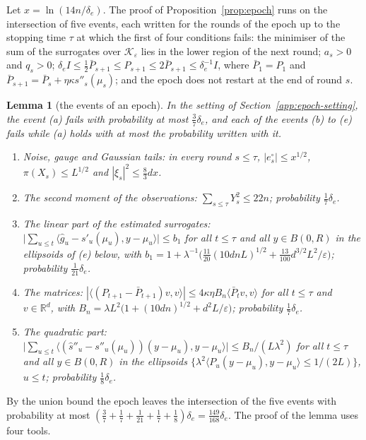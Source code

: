 \documentclass[11pt]{amsart}
\newtheorem{lemma}[theorem]{Lemma}
\theoremstyle{definition}
\numberwithin{equation}{section}
\newcommand{\R}{\mathbb{R}}
\newcommand{\cK}{\mathcal{K}}
\newcommand{\ip}[1]{\langle #1\rangle}
\begin{document}
Let $x=\ln(14n/\delta_e)$. The proof of Proposition~\ref{prop:epoch} runs on the intersection of five events, each written for the rounds of the epoch up to the stopping time $\tau$ at which the first of four conditions fails: the minimiser of the sum of the surrogates over $\cK_\varepsilon$ lies in the lower region of the next round; $a_s>0$ and $q_s>0$; $\delta_eI\le\frac12\bar P_{s+1}\le P_{s+1}\le2\bar P_{s+1}\le\delta_e^{-1}I$, where $\bar P_1=P_1$ and $\bar P_{s+1}=\bar P_s+\eta\kappa s''_s(\mu_s)$; and the epoch does not restart at the end of round $s$.
\begin{lemma}[the events of an epoch]\label{lem:events}
In the setting of Section~\ref{app:epoch-setting}, the event (a) fails with probability at most $\frac37\delta_e$, and each of the events (b) to (e) fails while (a) holds with at most the probability written with it.
\begin{enumerate}[label=(\alph*)]
\item Noise, gauge and Gaussian tails: in every round $s\le\tau$, $|e^\circ_s|\le x^{1/2}$, $\pi(X_s)\le L^{1/2}$ and $|\xi_s|^2\le\frac83dx$.
\item The second moment of the observations: $\sum_{s\le\tau}Y_s^2\le22n$; probability $\frac17\delta_e$.
\item The linear part of the estimated surrogates: $\bigl|\sum_{u\le t}\ip{\hat g_u-s'_u(\mu_u),y-\mu_u}\bigr|\le b_1$ for all $t\le\tau$ and all $y\in B(0,R)$ in the ellipsoids of (e) below, with $b_1=1+\lambda^{-1}\bigl(\frac{11}{20}(10dnL)^{1/2}+\frac{13}{100}d^{3/2}L^2/\varepsilon\bigr)$; probability $\frac1{21}\delta_e$.
\item The matrices: $|\ip{(P_{t+1}-\bar P_{t+1})v,v}|\le4\kappa\eta B_n\ip{\bar P_tv,v}$ for all $t\le\tau$ and $v\in\R^d$, with $B_n=\lambda L^2\bigl(1+(10dn)^{1/2}+d^2L/\varepsilon\bigr)$; probability $\frac17\delta_e$.
\item The quadratic part: $\bigl|\sum_{u\le t}\ip{(\hat s''_u-s''_u(\mu_u))(y-\mu_u),y-\mu_u}\bigr|\le B_n/(L\lambda^2)$ for all $t\le\tau$ and all $y\in B(0,R)$ in the ellipsoids $\{\lambda^2\ip{P_u(y-\mu_u),y-\mu_u}\le1/(2L)\}$, $u\le t$; probability $\frac18\delta_e$.
\end{enumerate}
\end{lemma}

By the union bound the epoch leaves the intersection of the five events with probability at most $(\frac37+\frac17+\frac1{21}+\frac17+\frac18)\delta_e=\frac{149}{168}\delta_e$. The proof of the lemma uses four tools.
\end{document}
